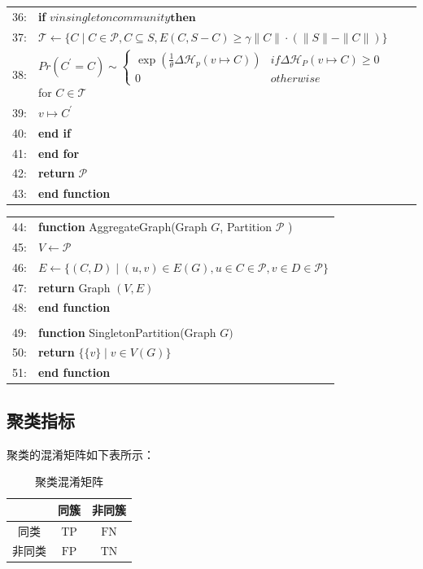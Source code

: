 \documentclass {article}
\begin{document}
\begin{table}[H]
\begin{tabular}{rl}
			36: & \qquad \textbf{if} $v in singleton community \textbf{then}$ \\
			37: & \qquad \quad $\mathcal{T} \leftarrow\{C \mid C \in \mathcal{P}, C \subseteq S, E(C, S-C) \geq \gamma\|C\| \cdot(\|S\|-\|C\|)\}$ \\
			38: & \qquad \quad ${Pr}\left(C^{\prime}=C\right) \sim\left\{\begin{array}{ll}\exp \left(\frac{1}{\theta} \Delta \mathcal{H}_p(v \mapsto C)\right) & { if } \Delta \mathcal{H}_P(v \mapsto C) \geq 0 \\ 0 & { otherwise }\end{array} \quad\right.$ for $C \in \mathcal{T}$\\
			39: & \qquad \quad $v \mapsto C^{\prime}$ \\
			40: & \qquad \textbf{end if} \\
			41: & \quad \textbf{end for} \\
			42: & \quad \textbf{return} $\mathcal{P}$ \\
			43: & \textbf{end function} \\
		\end{tabular}
	\end{table}	
	
	\begin{table}[H]
		\centering
		\begin{tabular}{rl}	   
			44: & \textbf{function} AggregateGraph(Graph $G$, Partition $\mathcal{P}$ ) \\
			45: & \quad $V \leftarrow \mathcal{P}$ \\
			46: & \quad $E \leftarrow\{(C, D) \mid(u, v) \in E(G), u \in C \in \mathcal{P}, v \in D \in \mathcal{P}\}$ \\
			47: & \quad \textbf{return} Graph $(V, E)$ \\
			48: & \textbf{end function} \\
			\\
			49: & \textbf{function} SingletonPartition(Graph $G)$ \\
			50: & \quad \textbf{return} $\{\{v\} \mid v \in V(G)\}$ \\
			51: & \textbf{end function} \\
			\hline
		\end{tabular}
	\end{table}	
	
	\subsection{聚类指标}
	聚类的混淆矩阵如下表所示：
	\begin{table}[H]
		\centering
		\caption{聚类混淆矩阵}
		\begin{tabular}{|c|c|c|}
			\hline 
			\hspace*{1in} & 同簇 & 非同簇 \\
			\hline 同类 & $\mathrm{TP}$ & $\mathrm{FN}$ \\
			\hline 非同类 & $\mathrm{FP}$ & $\mathrm{TN}$ \\
			\hline
		\end{tabular}
	\end{table}
	
\end{document}
